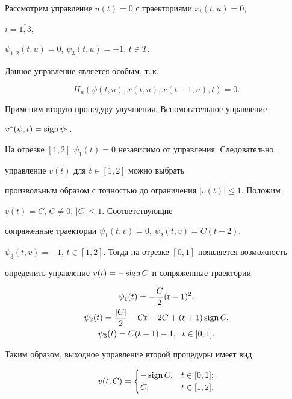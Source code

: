 Рассмотрим управление $u(t)=0$ с траекториями $x_i(t,u){=}0$,


$i{=}\overline{1,3}$,


$\psi_{1,2}(t,u){=}0$, $\psi_3(t,u)={-}1$, $t\in T$.


Данное управление является особым, т.\,к.


$$


H_u(\psi(t,u),x(t,u),x(t-1,u),t)=0.


$$





Применим вторую процедуру улучшения. Вспомогательное управление


$v^*(\psi,t)=\operatorname{sign}\psi_1$.


На отрезке $[1,2]$\; $\psi_1(t)=0$ независимо от управления. Следовательно,


управление $v(t)$ для $t\in [1,2]$ можно выбрать


произвольным образом с точностью до ограничения $| v(t)|{\leq} 1$. Положим


$v(t){=}C$, $C\ne0$, $|C|\leq 1$. Соответствующие


сопряженные траектории $\psi_1(t,v)=0$, $\psi_2(t,v)=C(t-2)$,


$\psi_3(t,v)=-1$, $t\in [1,2]$. Тогда на отрезке $[0,1]$ появляется возможность


определить управление $v(t)=-\operatorname{sign} C$ и сопряженные траектории


\begin{gather*}


\psi_1(t)=-\frac{C}{2}(t-1)^2,\\


\psi_2(t)=\frac{| C|}{2}-Ct-2C+(t+1)\sign C,\\


\psi_3(t)=C(t-1)-1,\ \;t\in [0,1].


\end{gather*}


Таким образом, выходное управление второй процедуры имеет вид


$$


v(t,C)=


\begin{cases}


-\sign C, & t\in [0,1]; \\


C, & t\in [1,2].


\end{cases}


$$





